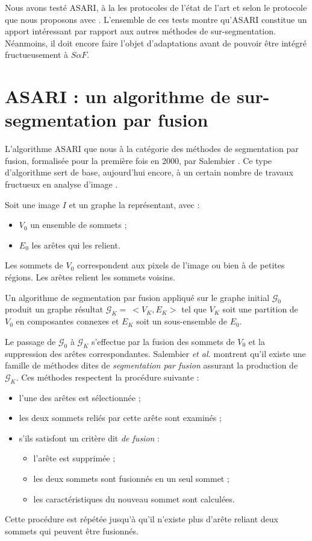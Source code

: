 Nous avons testé ASARI, à la  les protocoles de l'état de l'art \cite{achanta2012slic, stutz2015superpixel} et selon le protocole que nous proposons avec . L'ensemble de ces tests montre qu'ASARI constitue un apport intéressant par rapport aux autres méthodes de sur-segmentation. Néanmoins, il doit encore faire l'objet d'adaptations avant de pouvoir être intégré fructueusement à $S \alpha F$.

\section{ASARI : un algorithme de sur-segmentation par fusion}
\label{sec:ASARI}

L'algorithme ASARI que nous  à la catégorie des méthodes de segmentation par fusion, formalisée pour la première fois en 2000, par Salembier  \cite{salembier2000binary}. Ce type d'algorithme sert de base, aujourd'hui encore, à un certain nombre de travaux fructueux en analyse d'image \cite{Li2016region,xu2016connected}.

Soit une image $I$  et un graphe  la représentant, avec :
\begin{itemize}
\item $V_{0}$ un ensemble de sommets ;
\item  $E_{0}$ les arêtes qui les relient.
\end{itemize}
Les sommets de $V_{0}$ correspondent aux pixels de l'image ou bien à de petites régions. Les arêtes relient les sommets voisins. 

Un algorithme de segmentation par fusion appliqué sur le graphe initial $\mathcal{G}_{0}$ produit un graphe résultat $\mathcal{G}_{K}=\ <V_{K},E_{K}>$ tel que $V_{K}$ soit une partition de $V_{0}$ en composantes connexes et $E_{K}$ soit un sous-ensemble de $E_{0}$. 

Le passage de $\mathcal{G}_{0}$ à $\mathcal{G}_{K}$ s'effectue par la fusion des sommets de $V_{0}$ et la suppression des arêtes correspondantes. Salembier \textit{et al.} montrent qu'il existe une famille de méthodes dites de \emph{segmentation par fusion} assurant la production de $\mathcal{G}_{K}$. Ces méthodes respectent la procédure suivante :
\begin{itemize}
\item l'une des arêtes est sélectionnée ;
\item les deux sommets reliés par cette arête sont examinés ;
\item s'ils satisfont un critère dit \emph{de fusion} : 
\begin{itemize}
\item l'arête est supprimée ;
\item les deux sommets sont fusionnés en un seul sommet ;
\item les caractéristiques du nouveau sommet sont calculées.
\end{itemize}
\end{itemize}
Cette procédure est répétée jusqu'à qu'il n'existe plus d'arête reliant deux sommets qui peuvent être fusionnés. 

